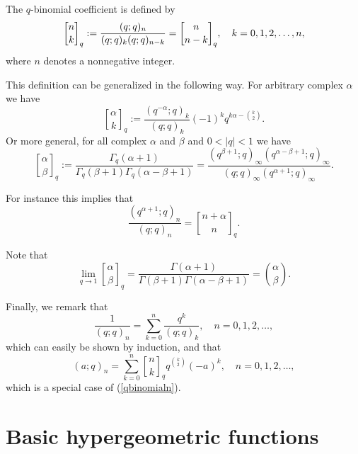 \documentclass[envcountchap,graybox]{svmono}
\renewcommand{\Gamma}{\varGamma}
\begin{document}
The $q$-binomial coefficient is defined by
\begin{equation}
\label{DefqBinomial1}\index{q-Binomial coefficient@$q$-Binomial coefficient}
\genfrac{[}{]}{0pt}{}{n}{k}_q:=\frac{(q;q)_n}{(q;q)_k(q;q)_{n-k}}=\genfrac{[}{]}{0pt}{}{n}{n-k}_q,
\quad k=0,1,2,\ldots,n,
\end{equation}
where $n$ denotes a nonnegative integer.

This definition can be generalized in the following way. For arbitrary
complex $\alpha$ we have
\begin{equation}
\label{DefqBinomial2}
\genfrac{[}{]}{0pt}{}{\alpha}{k}_q:=\frac{(q^{-\alpha};q)_k}{(q;q)_k}
(-1)^kq^{k\alpha-\binom{k}{2}}.
\end{equation}
Or more general, for all complex $\alpha$ and $\beta$ and $0<|q|<1$ we have
\begin{equation}
\label{DefqBinomial3}
\genfrac{[}{]}{0pt}{}{\alpha}{\beta}_q:=\frac{\Gamma_q(\alpha+1)}{\Gamma_q(\beta+1)\Gamma_q(\alpha-\beta+1)}
=\frac{(q^{\beta+1};q)_{\infty}(q^{\alpha-\beta+1};q)_{\infty}}
{(q;q)_{\infty}(q^{\alpha+1};q)_{\infty}}.
\end{equation}

For instance this implies that
$$\frac{(q^{\alpha+1};q)_n}{(q;q)_n}=\genfrac{[}{]}{0pt}{}{n+\alpha}{n}_q.$$

Note that
$$\lim\limits_{q\rightarrow 1}\genfrac{[}{]}{0pt}{}{\alpha}{\beta}_q
=\frac{\Gamma(\alpha+1)}{\Gamma(\beta+1)\Gamma(\alpha-\beta+1)}=\binom{\alpha}{\beta}.$$

Finally, we remark that
\begin{equation}
\label{qqn}
\frac{1}{(q;q)_n}=\sum_{k=0}^n\frac{q^k}{(q;q)_k},\quad n=0,1,2,\ldots,
\end{equation}
which can easily be shown by induction, and that
\begin{equation}
\label{aqn}
(a;q)_n=\sum_{k=0}^n\genfrac{[}{]}{0pt}{}{n}{k}_qq^{\binom{k}{2}}(-a)^k,\quad n=0,1,2,\ldots,
\end{equation}
which is a special case of (\ref{qbinomialn}).

\section{Basic hypergeometric functions}
\par\setcounter{equation}{0}\label{hypergeometric}
\label{qhypergeometric functions}
\end{document}
